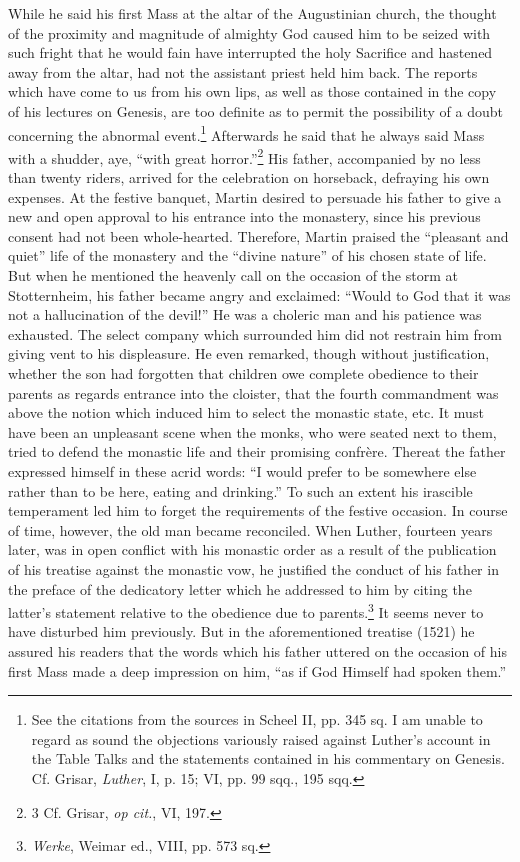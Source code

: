 While he said his first Mass at the altar of the Augustinian church,
the thought of the proximity and magnitude of almighty God caused
him to be seized with such fright that he would fain have interrupted
the holy Sacrifice and hastened away from the altar, had not
the assistant priest held him back. The reports which have come to
us from his own lips, as well as those contained in the copy of his
lectures on Genesis, are too definite as to permit the possibility of a
doubt concerning the abnormal event.\footnote{
See the citations from the sources in Scheel II, pp. 345 sq. I am unable to regard as
sound the objections variously raised against Luther’s account in the Table Talks and the
statements contained in his commentary on Genesis. Cf. Grisar, \textit{Luther}, I, p. 15; VI, pp.
99 sqq., 195 sqq.
}
Afterwards he said that he
always said Mass with a shudder, aye, “with great horror.”\footnote{3 Cf. Grisar, \textit{op cit.}, VI, 197.}
His father, accompanied by no less than twenty riders, arrived for
the celebration on horseback, defraying his own expenses. At the
festive banquet, Martin desired to persuade his father to give a
new and open approval to his entrance into the monastery, since
his previous consent had not been whole-hearted. Therefore, Martin
praised the “pleasant and quiet” life of the monastery and the “divine
nature” of his chosen state of life. But when he mentioned the heavenly
call on the occasion of the storm at Stotternheim, his father
became angry and exclaimed: “Would to God that it was not a
hallucination of the devil!” He was a choleric man and his patience
was exhausted. The select company which surrounded him did not
restrain him from giving vent to his displeasure. He even remarked,
though without justification, whether the son had forgotten that
children owe complete obedience to their parents as regards entrance
into the cloister, that the fourth commandment was above the notion
which induced him to select the monastic state, etc. It must have
been an unpleasant scene when the monks, who were seated next to
them, tried to defend the monastic life and their promising confrère.
Thereat the father expressed himself in these acrid words: “I
would prefer to be somewhere else rather than to be here, eating
and drinking.” To such an extent his irascible temperament led him
to forget the requirements of the festive occasion. In course of time,
however, the old man became reconciled. When Luther, fourteen
years later, was in open conflict with his monastic order as a result
of the publication of his treatise against the monastic vow, he justified
the conduct of his father in the preface of the dedicatory letter
which he addressed to him by citing the latter’s statement relative
to the obedience due to parents.\footnote{\textit{Werke}, Weimar ed., VIII, pp. 573 sq.}
It seems never to have disturbed
him previously. But in the aforementioned treatise (1521) he
assured his readers that the words which his father uttered on the
occasion of his first Mass made a deep impression on him, “as if God
Himself had spoken them.”
